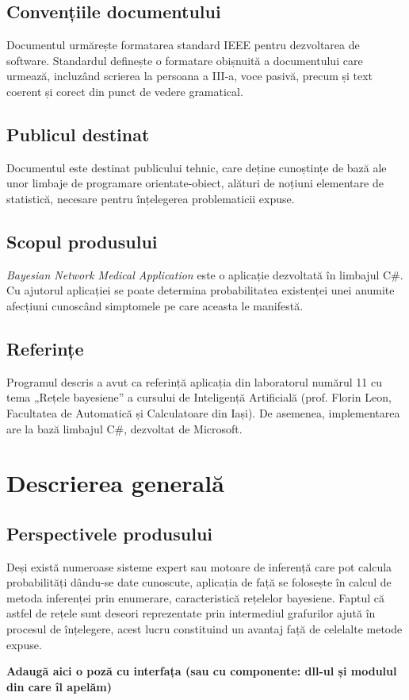 \documentclass{scrreprt}
\begin{document}
\section{Convențiile documentului}
Documentul urmărește formatarea standard IEEE pentru dezvoltarea de software. Standardul definește o formatare obișnuită a documentului care urmează, incluzând scrierea la persoana a III-a, voce pasivă, precum și text coerent și corect din punct de vedere gramatical.

\section{Publicul destinat}
Documentul este destinat publicului tehnic, care deține cunoștințe de bază ale unor limbaje de programare orientate-obiect, alături de noțiuni elementare de statistică, necesare pentru înțelegerea problematicii expuse.

\section{Scopul produsului}
\textit{Bayesian Network Medical Application} este o aplicație dezvoltată în limbajul C\#. Cu ajutorul aplicației se poate determina probabilitatea existenței unei anumite afecțiuni cunoscând simptomele pe care aceasta le manifestă.

\section{Referințe}
Programul descris a avut ca referință aplicația din laboratorul numărul 11 cu tema „Rețele bayesiene” a cursului de Inteligență Artificială (prof. Florin Leon, Facultatea de Automatică și Calculatoare din Iași). De asemenea, implementarea are la bază limbajul C\#, dezvoltat de Microsoft.

\chapter{Descrierea generală}

\section{Perspectivele produsului}
Deși există numeroase sisteme expert sau motoare de inferență care pot calcula probabilități dându-se date cunoscute, aplicația de față se folosește în calcul de metoda inferenței prin enumerare, caracteristică rețelelor bayesiene. Faptul că astfel de rețele sunt deseori reprezentate prin intermediul grafurilor ajută în procesul de înțelegere, acest lucru constituind un avantaj față de celelalte metode expuse.\par
\textbf{Adaugă aici o poză cu interfața (sau cu componente: dll-ul și modulul din care îl apelăm)}
\end{document}
